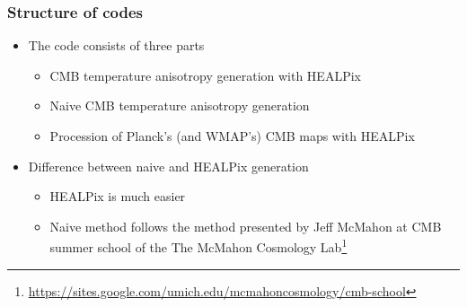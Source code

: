 \begin{frame}
\frametitle{Structure of codes}

\begin{itemize}
	\item<1-> The code consists of three parts
	\begin{itemize}
		\item<1-> CMB temperature anisotropy generation with HEALPix
		\item<1-> Naive CMB temperature anisotropy generation
		\item<1-> Procession of Planck's (and WMAP's) CMB maps with HEALPix
	\end{itemize}
	\item<2-> Difference between naive and HEALPix generation
	\begin{itemize}
		\item<2-> HEALPix is much easier
		\item<2-> Naive method follows the method presented by Jeff McMahon at CMB summer school of the The McMahon Cosmology Lab\footnote{\url{https://sites.google.com/umich.edu/mcmahoncosmology/cmb-school}}
		\end{itemize}
\end{itemize}

\end{frame}